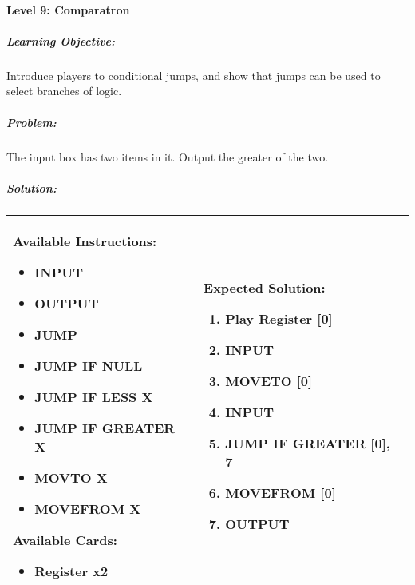 \paragraph{Level 9: Comparatron}
\subparagraph{Learning Objective:} Introduce players to conditional jumps, and 
show that jumps can be used to select branches of logic.

\subparagraph{Problem:} The input box has two items in it. Output the greater of the two.

\newpage
\subparagraph{Solution:} 
\begin{center}
    \begin{tabular}{ | m{5cm} | m{9cm} | } 
        \hline
            \textbf{Available Instructions:} 
            \begin{itemize}
                \setlength\itemsep{-.35em}
                \item INPUT
                \item OUTPUT
                \item JUMP
                \item JUMP IF NULL
                \item JUMP IF LESS X
                \item JUMP IF GREATER X
                \item MOVTO X
                \item MOVEFROM X
            \end{itemize}
            \textbf{Available Cards:} 
            \begin{itemize}
                \setlength\itemsep{-.35em}
                \item Register x2
            \end{itemize}& 
            \textbf{Expected Solution:} 
            \begin{enumerate}
                \setlength\itemsep{-.35em}
                \item Play Register [0]
                \item INPUT
                \item MOVETO [0]
                \item INPUT
                \item JUMP IF GREATER [0], 7
                \item MOVEFROM [0]
                \item OUTPUT
            \end{enumerate}
            \\
        \hline
    \end{tabular}
\end{center}

